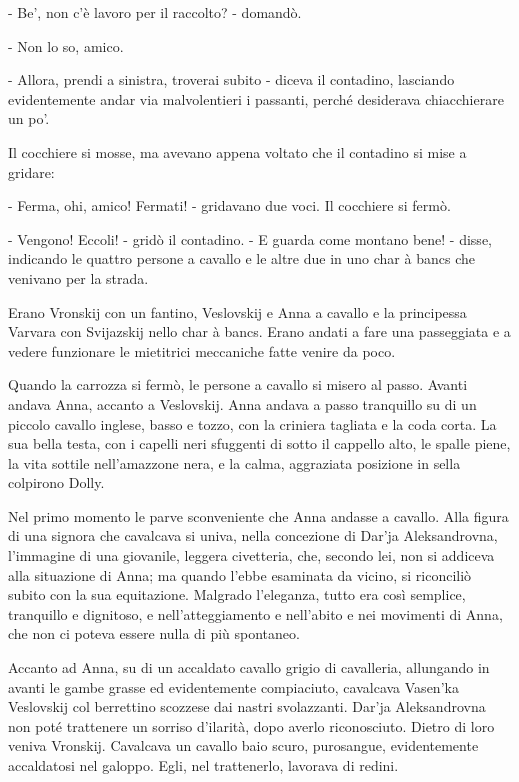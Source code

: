 - Be', non c'è lavoro per il raccolto? - domandò. 

- Non lo so, amico. 

- Allora, prendi a sinistra, troverai subito - diceva il contadino, lasciando evidentemente andar via malvolentieri i passanti, perché desiderava chiacchierare un po'. 

Il cocchiere si mosse, ma avevano appena voltato che il contadino si mise a gridare: 

- Ferma, ohi, amico! Fermati! - gridavano due voci. Il cocchiere si fermò. 

- Vengono! Eccoli! - gridò il contadino. - E guarda come montano bene! - disse, indicando le quattro persone a cavallo e le altre due in uno char à bancs che venivano per la strada. 

Erano Vronskij con un fantino, Veslovskij e Anna a cavallo e la principessa Varvara con Svijazskij nello char à bancs. Erano andati a fare una passeggiata e a vedere funzionare le mietitrici meccaniche fatte venire da poco. 

Quando la carrozza si fermò, le persone a cavallo si misero al passo. Avanti andava Anna, accanto a Veslovskij. Anna andava a passo tranquillo su di un piccolo cavallo inglese, basso e tozzo, con la criniera tagliata e la coda corta. La sua bella testa, con i capelli neri sfuggenti di sotto il cappello alto, le spalle piene, la vita sottile nell'amazzone nera, e la calma, aggraziata posizione in sella colpirono Dolly. 

Nel primo momento le parve sconveniente che Anna andasse a cavallo. Alla figura di una signora che cavalcava si univa, nella concezione di Dar'ja Aleksandrovna, l'immagine di una giovanile, leggera civetteria, che, secondo lei, non si addiceva alla situazione di Anna; ma quando l'ebbe esaminata da vicino, si riconciliò subito con la sua equitazione. Malgrado l'eleganza, tutto era così semplice, tranquillo e dignitoso, e nell'atteggiamento e nell'abito e nei movimenti di Anna, che non ci poteva essere nulla di più spontaneo. 

Accanto ad Anna, su di un accaldato cavallo grigio di cavalleria, allungando in avanti le gambe grasse ed evidentemente compiaciuto, cavalcava Vasen'ka Veslovskij col berrettino scozzese dai nastri svolazzanti. Dar'ja Aleksandrovna non poté trattenere un sorriso d'ilarità, dopo averlo riconosciuto. Dietro di loro veniva Vronskij. Cavalcava un cavallo baio scuro, purosangue, evidentemente accaldatosi nel galoppo. Egli, nel trattenerlo, lavorava di redini. 

